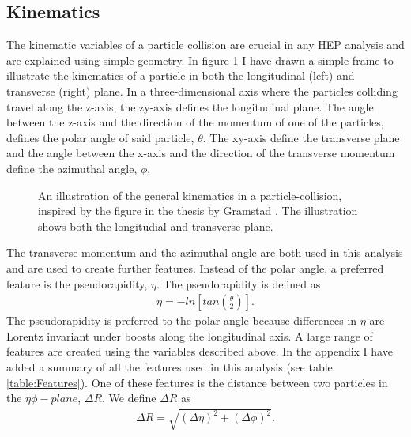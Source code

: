\subsection{Kinematics}
The kinematic variables of a particle collision are crucial in any \ac{HEP} analysis and are explained using simple 
geometry. In figure \ref{fig:Kinematics} I have drawn a simple frame to illustrate the kinematics of a particle in both the 
longitudinal (left) and transverse (right) plane. In a three-dimensional axis where the particles colliding travel along the 
z-axis, the zy-axis defines the longitudinal plane.  The angle between the z-axis and the direction of the momentum of
one of the particles, defines the polar angle of said particle, $\theta$. The xy-axis define the transverse plane and the 
angle between the x-axis and the direction of the transverse momentum define the azimuthal angle, $\phi$.
\begin{figure}
    \centering
    \caption[An illustration of the general kinematics in a particle-collision.]{An illustration of the general kinematics in a particle-collision, 
    inspired by the figure in the thesis by Gramstad \cite{gramstad_searches_nodate}. The illustration shows both the 
    longitudial and transverse plane. }
    \label{fig:Kinematics}
\end{figure}
The transverse momentum and the azimuthal angle are both used in this analysis and are used to create further features. 
Instead of the polar angle, a preferred feature is the pseudorapidity, $\eta$. The pseudorapidity is defined as 
\begin{align}\label{eq:eta}
    \eta = -ln\left[tan\left(\frac{\theta}{2}\right)\right].
\end{align}
The pseudorapidity is preferred to the polar angle because differences in $\eta$ are Lorentz invariant under boosts 
along the longitudinal axis. A large range of features are created using the variables described above. In the appendix I have 
added a summary of all the features used in this analysis (see table \ref{table:Features}). One of these features is the distance 
between two particles in the $\eta\phi-plane$, $\Delta R$. We define $\Delta R$ as 
\begin{align}
    \Delta R = \sqrt{(\Delta \eta)^2 + (\Delta \phi)^2}.
\end{align}
